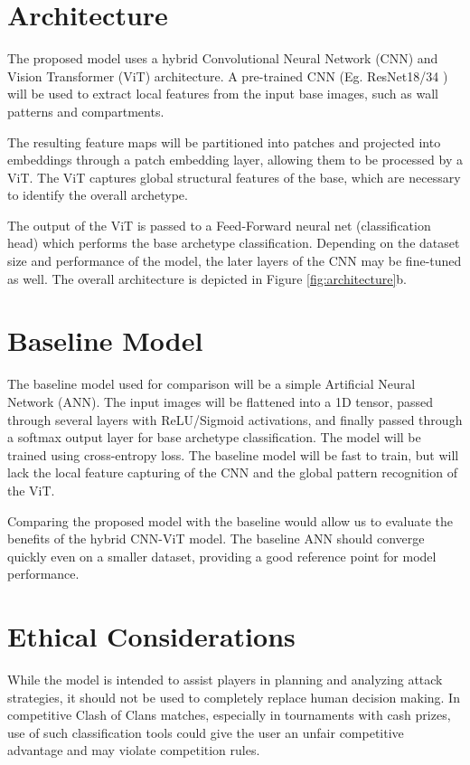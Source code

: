 \documentclass[final]{article}
\begin{document}
\section*{Architecture}

The proposed model uses a hybrid Convolutional Neural Network (CNN) and Vision Transformer (ViT) architecture. A pre-trained CNN (Eg. ResNet18/34 \cite{resnet}) will be used to extract local features from the input base images, such as wall patterns and compartments.

The resulting feature maps will be partitioned into patches and projected into embeddings through a patch embedding layer, allowing them to be processed by a ViT. The ViT captures global structural features of the base, which are necessary to identify the overall archetype. 

The output of the ViT is passed to a Feed-Forward neural net (classification head) which performs the base archetype classification. Depending on the dataset size and performance of the model, the later layers of the CNN may be fine-tuned as well. The overall architecture is depicted in Figure \ref{fig:architecture}b.


\section*{Baseline Model}

The baseline model used for comparison will be a simple Artificial Neural Network (ANN). The input images will be flattened into a 1D tensor, passed through several layers with ReLU/Sigmoid activations, and finally passed through a softmax output layer for base archetype classification. The model will be trained using cross-entropy loss. The baseline model will be fast to train, but will lack the local feature capturing of the CNN and the global pattern recognition of the ViT.

Comparing the proposed model with the baseline would allow us to evaluate the benefits of the hybrid CNN-ViT model. The baseline ANN should converge quickly even on a smaller dataset, providing a good reference point for model performance.

\section*{Ethical Considerations}

While the model is intended to assist players in planning and analyzing attack strategies, it should not be used to completely replace human decision making. In competitive Clash of Clans matches, especially in tournaments with cash prizes, use of such classification tools could give the user an unfair competitive advantage and may violate competition rules.
\end{document}
